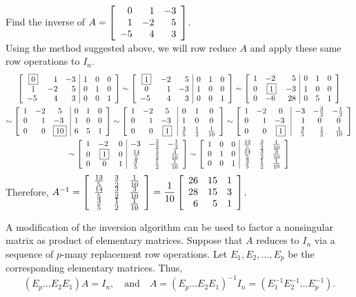 \begin{Exam}\label{exam:mtxInverse}
Find the inverse of $A=\mtx{rrr}{0&1&-3\\1&-2&5\\-5&4&3}$.\\

Using the method suggested above, we will row reduce $A$ and apply these same row operations to $I_n$.
\begin{multline*}
\mtx{crr|rrr}{\fbox{0}&1&-3&1&0&0\\1&-2&5&0&1&0\\-5\ &4&3&0&0&1} \sim \mtx{crr|rrr}{\fbox{1}&-2&5&0&1&0\\0&1&-3&1&0&0\\-5\ &4&3&0&0&1}
\sim \mtx{rcr|rrr}{1&-2\ &5&0&1&0\\0&\fbox{1}&-3&1&0&0\\0 &-6\ &28&0&5&1}\\
\sim \mtx{rrc|rrr}{1&-2&5&0&1&0\\0&1&-3\ &1&0&0\\0 &0&\fbox{10}&6&5&1} \sim \mtx{rrc|ccc}{1&-2&5&0&1&0\\0&1&-3\ &1&0&0\\0 &0&\fbox{1}&\frac{3}{5}&\frac{1}{2}&\frac{1}{10}}\sim \mtx{rrc|rrr}{1&-2&0&-3&-\frac{3}{2}&-\frac{1}{2}\\0&1&-3\ &1&0\ &0\ \\0 &0&\fbox{1}&\frac{3}{5}&\frac{1}{2}&\frac{1}{10}} \\
 \sim \mtx{rcr|rrr}{1&-2\ &0&-3&-\frac{3}{2}&-\frac{1}{2}\\0&\fbox{1}&0&\frac{14}{5}&\frac{3}{2}&\frac{3}{10}\\0 &0&1&\frac{3}{5}\ &\frac{1}{2}&\frac{1}{10}} \sim \mtx{rcr|ccc}{1&0&0&\frac{13}{5}&\frac{3}{2}&\frac{1}{10}\\0&1&0&\frac{14}{5}&\frac{3}{2}&\frac{3}{10}\\0 &0&1&\frac{3}{5}&\frac{1}{2}&\frac{1}{10}}
\end{multline*} Therefore, $A^{-1} = \mtx{ccc}{\frac{13}{5}&\frac{3}{2}&\frac{1}{10}\\\frac{14}{5}&\frac{3}{2}&\frac{3}{10}\\\frac{3}{5}&\frac{1}{2}&\frac{1}{10}} = \dfrac{1}{10}\mtx{rrr}{26&15&1\\28&15&3\\6&5&1}$.
\end{Exam}\vs

A modification of the inversion algorithm can be used to factor a nonsingular matrix as product of elementary matrices. Suppose that $A$ reduces to $I_n$ via a sequence of $p$-many replacement row operations. Let $E_1, E_2, \ldots, E_p$ be the corresponding elementary matrices. Thus, 
\[(E_p\ldots E_2E_1)A = I_n,\quad\text{and}\quad A = (E_p\ldots E_2E_1)^{-1}I_n = (E_1^{-1}E_2^{-1}\ldots E_p^{-1}).\]

